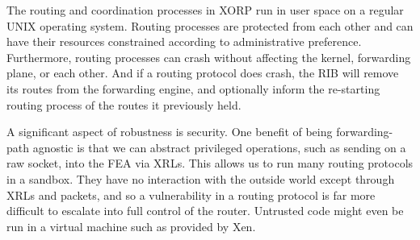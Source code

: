 The routing and coordination processes in XORP run in user space on a
regular UNIX operating system.  Routing processes are protected
from each other and can have their resources constrained according to
administrative preference.  Furthermore, routing processes can crash
without affecting the kernel, forwarding plane, or each other.  And if
a routing protocol does crash, the RIB will remove its routes
from the forwarding engine, and optionally inform the re-starting
routing process of the routes it previously held.


A significant aspect of robustness is security.  One benefit of
being forwarding-path agnostic is that we can abstract
privileged operations, such as sending on a raw socket, into
the FEA via XRLs.  This allows us to run many routing protocols
in a sandbox. They have no interaction with the outside world except
through XRLs and packets, and so a vulnerability in a routing
protocol is far more difficult to escalate into full control of the
router.  Untrusted code might even be run in a virtual
machine such as provided by Xen\cite{xen}.



